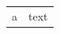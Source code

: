 \documentclass{article}
\begin{document}
\begin{tabularx}{\textwidth}{lX}
a & \multirow{2}{*}{text} \
\end{tabularx}
\end{document}
